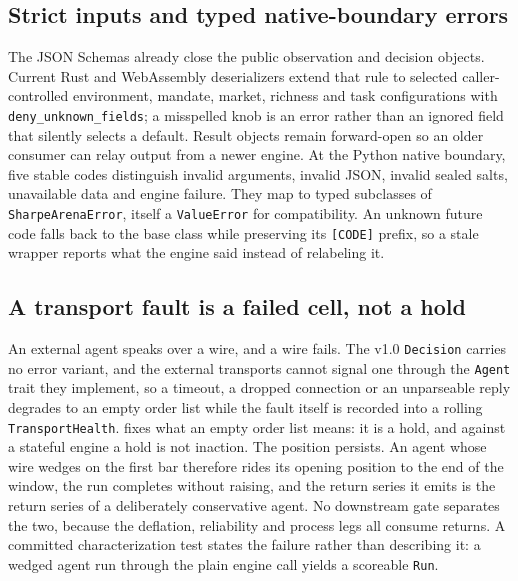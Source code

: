 \subsection{Strict inputs and typed native-boundary errors}\label{sec:strict-inputs}

The JSON Schemas already close the public observation and decision objects. Current Rust and WebAssembly deserializers extend that rule to selected caller-controlled environment, mandate, market, richness and task configurations with \texttt{deny\_unknown\_fields}; a misspelled knob is an error rather than an ignored field that silently selects a default. Result objects remain forward-open so an older consumer can relay output from a newer engine. At the Python native boundary, five stable codes distinguish invalid arguments, invalid JSON, invalid sealed salts, unavailable data and engine failure. They map to typed subclasses of \texttt{SharpeArenaError}, itself a \texttt{ValueError} for compatibility. An unknown future code falls back to the base class while preserving its \texttt{[CODE]} prefix, so a stale wrapper reports what the engine said instead of relabeling it.

\subsection{A transport fault is a failed cell, not a hold}\label{sec:transport-gate}

An external agent speaks over a wire, and a wire fails. The v1.0 \texttt{Decision} carries no error variant, and the external transports cannot signal one through the \texttt{Agent} trait they implement, so a timeout, a dropped connection or an unparseable reply degrades to an empty order list while the fault itself is recorded into a rolling \texttt{TransportHealth}.  fixes what an empty order list means: it is a hold, and against a stateful engine a hold is not inaction. The position persists. An agent whose wire wedges on the first bar therefore rides its opening position to the end of the window, the run completes without raising, and the return series it emits is the return series of a deliberately conservative agent. No downstream gate separates the two, because the deflation, reliability and process legs all consume returns. A committed characterization test states the failure rather than describing it: a wedged agent run through the plain engine call yields a scoreable \texttt{Run}.

